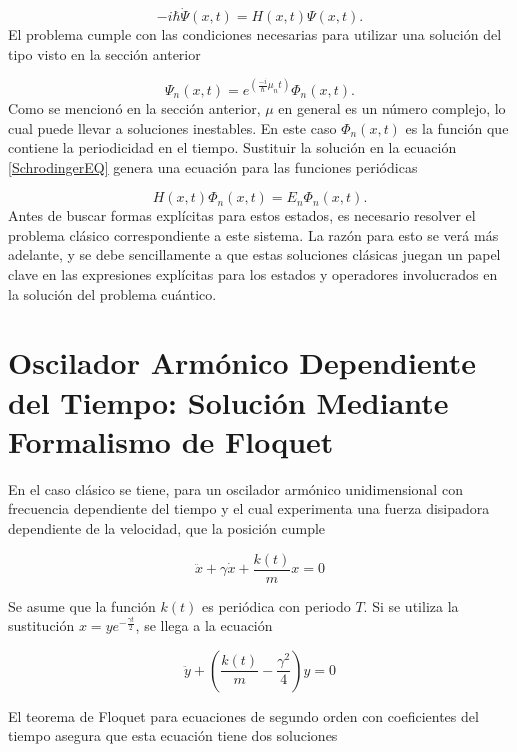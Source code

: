 \documentclass[10pt,a4paper]{report}
\begin{document}
\begin{equation}\label{SchrodingerEQ}
-i\hbar\dot{\Psi}(x,t) = H(x,t)\Psi(x,t).
\end{equation} El problema cumple con las condiciones necesarias para utilizar una solución del tipo visto en la sección anterior

\begin{equation}
\Psi_n(x,t) = e^{(\frac{-i}{\hbar}\mu_nt)}\Phi_n(x,t).
\end{equation} Como se mencionó en la sección anterior, $\mu$ en general es un número complejo, lo cual puede llevar a soluciones inestables. En este caso $\Phi_n(x,t)$ es la función que contiene la periodicidad en el tiempo. Sustituir la solución en la ecuación \eqref{SchrodingerEQ} genera una ecuación para las funciones periódicas

\begin{equation}
H(x,t)\Phi_n(x,t)=E_n\Phi_n(x,t).
\end{equation} Antes de buscar formas explícitas para estos estados, es necesario resolver el problema clásico correspondiente a este sistema. La razón para esto se verá más adelante, y se debe sencillamente a que estas soluciones clásicas juegan un papel clave en las expresiones explícitas para los estados y operadores involucrados en la solución del problema cuántico.

\section{Oscilador Armónico Dependiente del Tiempo: Solución Mediante Formalismo de Floquet}

En el caso clásico \cite{HanngiFM} se tiene, para un oscilador armónico unidimensional con frecuencia dependiente del tiempo y el cual experimenta una fuerza disipadora dependiente de la velocidad, que la posición cumple

\begin{equation}
\ddot{x}+\gamma\dot{x}+\frac{k(t)}{m}x=0
\end{equation}

Se asume que la función $k(t)$ es periódica con periodo $T$. Si se utiliza la sustitución $x=ye^{-\frac{\gamma t}{2}}$, se llega a la ecuación

\begin{equation}
\ddot{y} +(\frac{k(t)}{m}-\frac{\gamma^2}{4})y=0
\end{equation}

El teorema de Floquet para ecuaciones de segundo orden con
coeficientes  del tiempo \cite{HanngiFM} asegura
que esta ecuación tiene dos soluciones
\end{document}
